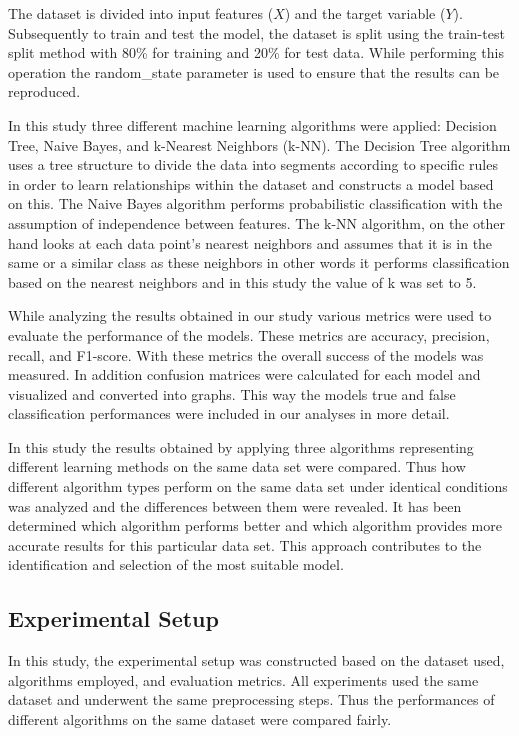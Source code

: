 \documentclass[conference]{IEEEtran}
\begin{document}
    The dataset is divided into input features ($X$) and the target variable ($Y$).  Subsequently to train and test the model, the dataset is split using the train-test split method with 80\%  for training and 20\% for test data. While performing this operation the random\_state parameter is used to ensure that the results can be reproduced.

    In this study three different machine learning algorithms were applied:  Decision Tree, Naive Bayes, and k-Nearest Neighbors (k-NN). The Decision Tree algorithm uses a tree structure to divide the data into segments according to specific rules in order to learn relationships within the dataset and constructs a model based on this. The Naive Bayes algorithm performs probabilistic classification with the assumption of independence between features. The k-NN algorithm, on the other hand looks at each data point's nearest neighbors and assumes that it is in the same or a similar class as these neighbors in other words it performs classification based on the nearest neighbors and in this study the value of k was set to 5.

    While analyzing the results obtained in our study various metrics were used to evaluate the performance of the models. These metrics are accuracy, precision, recall, and F1-score. With these metrics the overall success of the models was measured. In addition confusion matrices were calculated for each model and visualized and converted into graphs. This way the models true and false classification performances were included in our analyses in more detail.

    In this study the results obtained by applying three algorithms representing different learning methods on the same data set were compared. Thus how different algorithm types perform on the same data set under identical conditions was analyzed and the differences between them were revealed. It has been determined which algorithm performs better and which algorithm provides more accurate results for this particular data set. This approach contributes to the identification and selection of the most suitable model.

	
	\subsection{Experimental Setup}

In this study, the experimental setup was constructed based on the dataset used, algorithms employed, and evaluation metrics. All experiments used the same dataset and underwent the same preprocessing steps. Thus the performances of different algorithms on the same dataset were compared fairly.
\end{document}
